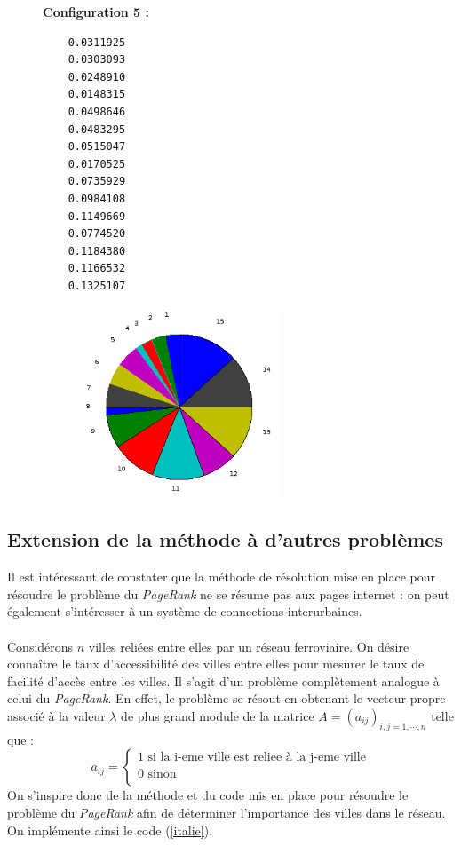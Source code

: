 \documentclass[a4paper,10pt]{report}
\begin{document}
\begin{figure}[H]
\begin{minipage}[c]{.40\linewidth}
\noindent \textbf{Configuration 5 :}
\begin{verbatim}
    0.0311925  
    0.0303093  
    0.0248910  
    0.0148315  
    0.0498646  
    0.0483295  
    0.0515047  
    0.0170525  
    0.0735929  
    0.0984108  
    0.1149669  
    0.0774520  
    0.1184380  
    0.1166532  
    0.1325107
\end{verbatim}
\end{minipage} \hfill
\begin{minipage}[c]{.58\linewidth}
\begin{figure}[H]
   \includegraphics[width=6cm]{diag_config5.png}
   \end{figure}
\end{minipage}
\end{figure}

\newpage
\subsection{Extension de la méthode à d'autres problèmes}
Il est intéressant de constater que la méthode de résolution mise en place pour résoudre le problème du \textit{PageRank} ne se résume pas aux pages internet : on peut également s'intéresser à un système de connections interurbaines.\\ \\
Considérons $n$ villes reliées entre elles par un réseau ferroviaire. On désire connaître le taux d'accessibilité des villes entre elles pour mesurer le taux de facilité d'accès entre les villes. Il s'agit d'un problème complètement analogue à celui du \textit{PageRank}. En effet, le problème se résout en obtenant le vecteur propre associé à la valeur $\lambda$ de plus grand module de la matrice $A=(a_{ij})_{i,j=1,\cdots , n}$ telle que :\\
\begin{displaymath}
a_{ij}= \left\lbrace
\begin{array}{l}
1 \text{ si la i-eme ville est reliee à la j-eme ville}  \\
0 \text{ sinon} \\
\end{array}\right.
\end{displaymath}
On s'inspire donc de la méthode et du code mis en place pour résoudre le problème du \textit{PageRank} afin de déterminer l'importance des villes dans le réseau. On implémente ainsi le code (\ref{italie}).
\end{document}

